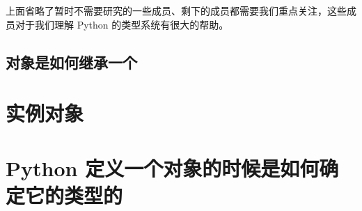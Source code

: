 上面省略了暂时不需要研究的一些成员、剩下的成员都需要我们重点关注，这些成员对于我们理解 Python 的类型系统有很大的帮助。

\subsection{对象是如何继承一个}

\section{实例对象}

\section{Python 定义一个对象的时候是如何确定它的类型的}


























